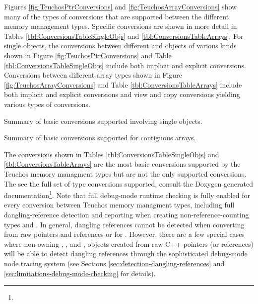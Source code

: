 \documentclass[pdf,ps2pdf,11pt]{SANDreport}
\begin{document}
Figures {}\ref{fig:TeuchosPtrConversions} and
{}\ref{fig:TeuchosArrayConversions} show many of the types of
conversions that are supported between the different memory management
types.  Specific conversions are shown in more detail in Tables
{}\ref{tbl:ConversionsTableSingleObjs} and
{}\ref{tbl:ConversionsTableArrays}.  For single objects, the
conversions between different {} and {} objects of
various kinds shown in Figure {}\ref{fig:TeuchosPtrConversions} and
Table {}\ref{tbl:ConversionsTableSingleObjs} include both implicit and
explicit conversions.  Conversions between different array types shown
in Figure {}\ref{fig:TeuchosArrayConversions} and Table
{}\ref{tbl:ConversionsTableArrays} include both implicit and explicit
conversions and view and copy conversions yielding various types of
conversions.


\begin{table}
\begin{center}

\caption{\label{tbl:ConversionsTableSingleObjs}
Summary of basic conversions supported involving single objects.}
\end{center}
\end{table}


\begin{table}
\begin{center}

\caption{\label{tbl:ConversionsTableArrays}
Summary of basic conversions supported for contiguous arrays.}
\end{center}
\end{table}

The conversions shown in Tables {}\ref{tbl:ConversionsTableSingleObjs}
and {}\ref{tbl:ConversionsTableArrays} are the most basic conversions
supported by the Teuchos memory managment types but are not the only
supported conversions.  The see the full set of type conversions
supported, consult the Doxygen generated
documentation\footnote{}.
Note that full debug-mode runtime checking is fully enabled for every
conversion between Teuchos memory managment types, including full
dangling-reference detection and reporting when creating
non-reference-counting types {} and {}.  In
general, dangling references cannot be detected when converting from
raw pointers and references or for {}.  However,
there are a few special cases where non-owning {},
{}, and {}, {} objects created
from raw C++ pointers (or references) will be able to detect dangling
references through the sophisticated debug-mode node tracing system
(see Sections {}\ref{sec:detection-dangling-references} and
{}\ref{sec:limitations-debug-mode-checking} for details).
\end{document}
